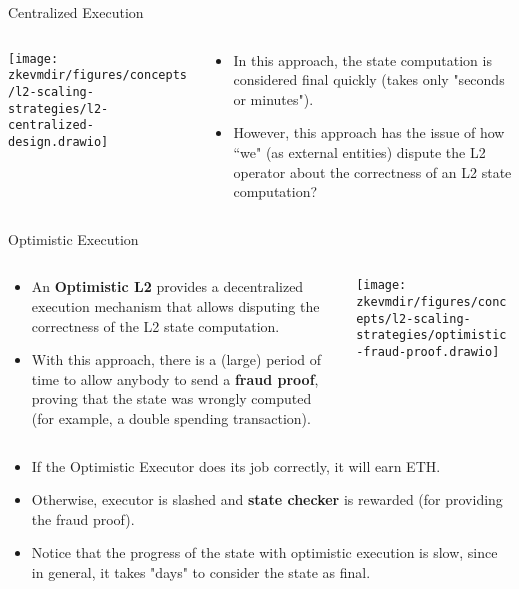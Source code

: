 \begin{frame}{Centralized Execution}
\begin{columns}
\begin{column}{0.6\textwidth}
\texttt{[image: \\zkevmdir/figures/concepts/l2-scaling-strategies/l2-centralized-design.drawio]}
\end{column}
\begin{column}{0.4\textwidth}
\begin{itemize}
\item In this approach, the state computation is considered final quickly (takes only "seconds or minutes").
\item However, this approach has the issue of how ``we" (as external entities) dispute the L2 operator
about the correctness of an L2 state computation?
\end{itemize}
\end{column}
\end{columns}
\end{frame}





\begin{frame}{Optimistic Execution}
\begin{columns}
\begin{column}{0.45\textwidth}
\begin{itemize}
\small
\item An \textbf{Optimistic L2} provides a decentralized execution mechanism that allows
disputing the correctness of the L2 state computation.
\item With this approach, there is a (large) period of time to allow
anybody to send a \textbf{fraud proof},
proving that the state was wrongly computed (for example, a double spending transaction).
\end{itemize}
\end{column}
\begin{column}{0.53\textwidth}
\texttt{[image: \\zkevmdir/figures/concepts/l2-scaling-strategies/optimistic-fraud-proof.drawio]}
\end{column}
\end{columns}
\begin{itemize}
\small
\item If the Optimistic Executor does its job correctly,
 it will earn ETH.
\item Otherwise, executor is slashed and \textbf{state checker} is rewarded 
(for providing the fraud proof).
\item Notice that the progress of the state with optimistic execution is slow,
since in general, it takes "days" to consider the state as final.
\end{itemize}
\end{frame}





